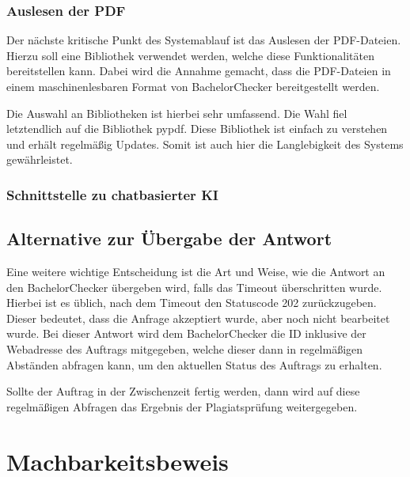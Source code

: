 \subsubsection{Auslesen der PDF}\label{subsubsec:pdf}
Der nächste kritische Punkt des Systemablauf ist das Auslesen der PDF-Dateien.
Hierzu soll eine Bibliothek verwendet werden, welche diese Funktionalitäten bereitstellen kann.
Dabei wird die Annahme gemacht, dass die PDF-Dateien in einem maschinenlesbaren Format von BachelorChecker bereitgestellt werden.

Die Auswahl an Bibliotheken ist hierbei sehr umfassend.
Die Wahl fiel letztendlich auf die Bibliothek pypdf.
Diese Bibliothek ist einfach zu verstehen und erhält regelmäßig Updates.
Somit ist auch hier die Langlebigkeit des Systems gewährleistet.

\subsubsection{Schnittstelle zu chatbasierter KI}\label{subsubsec:ki}

\subsection{Alternative zur Übergabe der Antwort}\label{subsec:alternative-zur-uebergabe-der-antwort}
Eine weitere wichtige Entscheidung ist die Art und Weise, wie die Antwort an den BachelorChecker übergeben wird,
falls das Timeout überschritten wurde.
Hierbei ist es üblich, nach dem Timeout den Statuscode 202 zurückzugeben.
Dieser bedeutet, dass die Anfrage akzeptiert wurde, aber noch nicht bearbeitet wurde\autocite{mozilla}.
Bei dieser Antwort wird dem BachelorChecker die ID inklusive der Webadresse des Auftrags mitgegeben,
welche dieser dann in regelmäßigen Abständen abfragen kann, um den aktuellen Status des Auftrags zu erhalten.

Sollte der Auftrag in der Zwischenzeit fertig werden, dann wird auf diese regelmäßigen Abfragen das Ergebnis
der Plagiatsprüfung weitergegeben.



\section{Machbarkeitsbeweis}\label{sec:machbarkeitsbeweis}